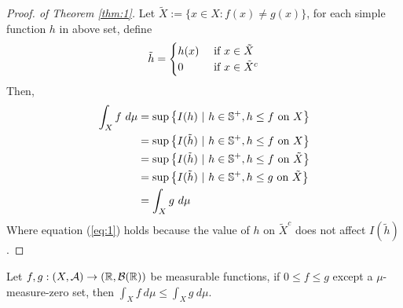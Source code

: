 \documentclass[11pt]{article}
\begin{document}
	\begin{proof}[Proof. of Theorem \ref{thm:1}]
		Let $\tilde{X} := \{x \in X: f(x) \neq g(x)\}$, for each simple function $h$ in above set, define
		\begin{align}
			\tilde{h} = \begin{cases}
				h(x) &\text{{ if }} x \in \tilde{X} \\
				0 &\text{{ if }} x \in \tilde{X}^c
			\end{cases}
		\end{align}
		Then,
		\begin{align}
			\int_X f\ d\mu &= \sup \left \{I(h)\ |\ h \in \mathbb{S}^+, h \leq f \text{{ on }} X \right\} \\
			&= \sup \left \{I(\tilde{h})\ |\ {h} \in \mathbb{S}^+, {h} \leq f \text{{ on }} {X} \right\} \\
			&= \sup \left \{I(\tilde{h})\ |\ {h} \in \mathbb{S}^+, {h} \leq f \text{{ on }} \tilde{X} \right\} \label{eq:1}\\
			&= \sup \left \{I(\tilde{h})\ |\ {h} \in \mathbb{S}^+, {h} \leq g \text{{ on }} \tilde{X} \right\} \\
			&= \int_X g\ d\mu
		\end{align}
		Where equation (\ref{eq:1}) holds because the value of $h$ on $\tilde{X}^c$ does not affect $I(\tilde{h})$.
	\end{proof}

	\begin{theorem}
		Let $f, g: (X, \mathcal{{A}}) \to (\mathbb{R}, \mathcal{{B}}(\mathbb{R}))$ be measurable functions, if $0 \leq f \leq g$ except a $\mu$-measure-zero set, then $\int_X f\ d\mu \leq \int_X g\ d\mu$.
	\end{theorem}
	
\end{document}
